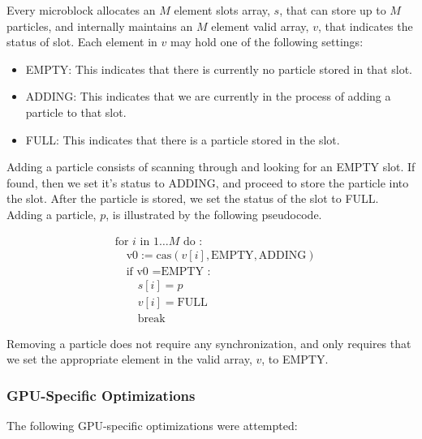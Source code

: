 \documentclass[11pt]{article} %
\begin{document}
Every microblock allocates an $M$ element slots array, $s$, that
can store up to $M$ particles, and internally maintains an $M$ element
valid array, $v$, that indicates the status of slot. Each element
in $v$ may hold one of the following settings:
\begin{itemize}
\item EMPTY: This indicates that there is currently no particle stored in
that slot.
\item ADDING: This indicates that we are currently in the process of adding
a particle to that slot.
\item FULL: This indicates that there is a particle stored in the slot.
\end{itemize}
Adding a particle consists of scanning through and looking for an
EMPTY slot. If found, then we set it's status to ADDING, and proceed
to store the particle into the slot. After the particle is stored,
we set the status of the slot to FULL. Adding a particle, $p$, is
illustrated by the following pseudocode.

\[
\begin{aligned} & \text{for }i\text{ in }1\ldots M\text{ do :}\\
 & \quad\text{v0}:=\text{cas}(v[i],\text{EMPTY},\text{ADDING})\\
 & \quad\text{if v0 }=\text{EMPTY :}\\
 & \quad\quad s[i]=p\\
 & \quad\quad v[i]=\text{FULL}\\
 & \quad\quad\text{break}
\end{aligned}
\]


Removing a particle does not require any synchronization, and only
requires that we set the appropriate element in the valid array, $v$,
to EMPTY.

\subsubsection{GPU-Specific Optimizations}

The following GPU-specific optimizations were attempted:
\end{document}
